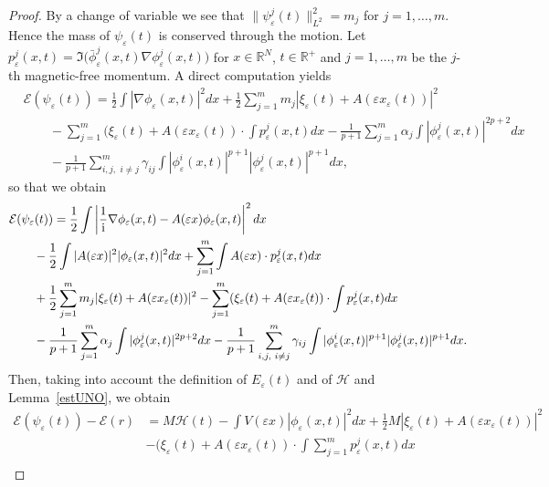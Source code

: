 \documentclass[11pt]{amsart}
\numberwithin{equation}{section}
\theoremstyle{definition}
\begin{document}
\begin{proof}
By a change of variable we see that
$\|\psi_{\varepsilon}^j(t)\|_{L^2}^{2}=m_j$ for $j=1,\dots,m$. Hence the
mass of $\psi_{\varepsilon}(t)$ is conserved through the motion. Let
$p_{\varepsilon}^j(x,t)={{\Im}}\big(\bar\phi_{\varepsilon}^j(x,t)\nabla\phi_{\varepsilon}^j(x,t)\big)$
for $x\in{{\mathbb R}}^N$, $t\in{{\mathbb R}}^+$ and $j=1,\dots,m$ be the $j$-th
magnetic-free momentum. A direct computation yields
\begin{align*}
&\mathcal E(\psi_{\varepsilon}(t))=\frac1{2}\int |\nabla
\phi_{\varepsilon}(x,t)|^{2}dx +
\frac12\sum_{j=1}^m m_j|\xi_{\varepsilon}(t)+A({\varepsilon} x_{\varepsilon}(t))|^2    \\
& \qquad -\sum_{j=1}^m(\xi_{\varepsilon}(t)+A({\varepsilon} x_{\varepsilon}(t))\cdot \int p_{\varepsilon}^j(x,t)dx -
\frac{1}{p+1}\sum_{j=1}^m\alpha_j\int |\phi_{\varepsilon}^j(x,t)|^{2p+2}dx\\
& \qquad -\frac{1}{p+1}\sum_{i,j,\,\, i\neq j}^m\gamma_{ij}
\int |\phi_{\varepsilon}^i(x,t)|^{p+1}|\phi_{\varepsilon}^j(x,t)|^{p+1}dx,
\end{align*}
so that we obtain
\begin{align*}
& \mathcal
E(\psi_{\varepsilon}(t))=\frac1{2}\int\left|\frac{1}{{\rm i}}\nabla
\phi_{\varepsilon}(x,t)-A({\varepsilon} x)\phi_{\varepsilon}(x,t)\right|^{2}dx \\
& \qquad -\frac{1}{2}\int |A({\varepsilon} x)|^2|\phi_{\varepsilon}(x,t)|^2 dx
+\sum_{j=1}^m\int A({\varepsilon} x)\cdot p_{\varepsilon}^j(x,t)dx \\
& \qquad
+\frac1 2 \sum_{j=1}^m m_j|\xi_{\varepsilon}(t)+A({\varepsilon} x_{\varepsilon}(t))|^2
-\sum_{j=1}^m(\xi_{\varepsilon}(t)+A({\varepsilon} x_{\varepsilon}(t))\cdot \int
p_{\varepsilon}^j(x,t)dx\\
& \qquad -\frac{1}{p+1}\sum_{j=1}^m\alpha_j\int
|\phi_{\varepsilon}^j(x,t)|^{2p+2}dx -\frac{1}{p+1}\sum_{i,j,\,\, i\neq
j}^m\gamma_{ij} \int
|\phi_{\varepsilon}^i(x,t)|^{p+1}|\phi_{\varepsilon}^j(x,t)|^{p+1}dx.
\end{align*}
Then, taking into account the definition of $E_{\varepsilon}(t)$ and of
$\mathcal H$ and Lemma~\ref{estUNO}, we obtain
\begin{align*}
\mathcal E(\psi_{\varepsilon}(t))-{\mathcal E}(r) &=M{\mathcal H}(t)
-\int V({\varepsilon} x)|\phi_{\varepsilon}(x,t)|^{2}dx+\frac12 M|\xi_{\varepsilon}(t)+A({\varepsilon} x_{\varepsilon}(t))|^2   \\
&-(\xi_{\varepsilon}(t)+A({\varepsilon} x_{\varepsilon}(t))\cdot \int \sum_{j=1}^m p_{\varepsilon}^j(x,t)dx  \\

\end{align*}
\end{proof}
\end{document}
